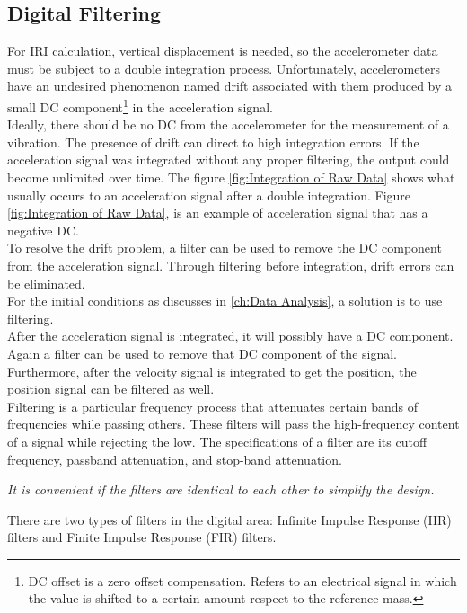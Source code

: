 \documentclass[tesi]{subfiles}
\begin{document}
\subsection{Digital Filtering} \label{ssc:Digital Filtering}
For IRI calculation, vertical displacement is needed, so the accelerometer data must be subject to a double integration process. 
Unfortunately, accelerometers have an undesired phenomenon named drift associated with them produced by a small DC component\footnote{DC offset is a zero offset compensation. Refers to an electrical signal in which the value is shifted to a certain amount respect to the reference mass.} in the acceleration signal.\\
Ideally, there should be no DC from the accelerometer for the measurement of a vibration. The presence of drift can direct to high integration errors. If the acceleration signal was integrated without any proper filtering, the output could become unlimited over time. The figure \ref{fig:Integration of Raw Data} shows what usually occurs to an acceleration signal after a double integration. Figure \ref{fig:Integration of Raw Data}, is an example of acceleration signal that has a negative DC.\\To resolve the drift problem, a filter can be used to remove the DC component from the acceleration signal. Through filtering before integration, drift errors can be eliminated.\\
For the initial conditions as discusses in \ref{ch:Data Analysis}, a solution is to use filtering.\\  
After the acceleration signal is integrated, it will possibly have a DC component. Again a filter can be used to remove that DC component of the signal. Furthermore, after the velocity signal is integrated to get the position, the position signal can be filtered as well.	\\
Filtering is a particular frequency process that attenuates certain bands of frequencies while passing others. These filters will pass the high-frequency content of a signal while rejecting the low. The specifications of a filter are its cutoff frequency, passband attenuation, and stop-band attenuation. 
\begin{center}\textit{It is convenient if the filters are identical to each other to simplify the design.}\end{center}


\noindent There are two types of filters in the digital area: Infinite Impulse Response (IIR) filters and Finite Impulse Response (FIR) filters. 
\end{document}
